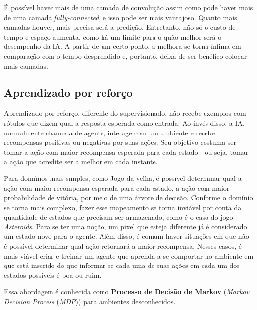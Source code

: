 É possível haver mais de uma camada de convolução assim como pode haver mais de uma camada \textit{fully-connected}, e isso pode ser mais vantajoso. Quanto mais camadas houver, mais precisa será a predição. Entretanto, não só o custo de tempo e espaço aumenta, como há um limite para o quão melhor será o desempenho da IA. A partir de um certo ponto, a melhora se torna ínfima em comparação com o tempo desprendido e, portanto, deixa de ser benéfico colocar mais camadas.

\subsection{Aprendizado por reforço}
\label{sec:rl}

Aprendizado por reforço, diferente do supervisionado, não recebe exemplos com rótulos que dizem qual a resposta esperada como entrada. Ao invés disso, a IA, normalmente chamada de agente, interage com um ambiente e recebe recompensas positivas ou negativas por suas ações. Seu objetivo costuma ser tomar a ação com maior recompensa esperada para cada estado - ou seja, tomar a ação que acredite ser a melhor em cada instante.

Para domínios mais simples, como Jogo da velha, é possível determinar qual a ação com maior recompensa esperada para cada estado, a ação com maior probabilidade de vitória, por meio de uma árvore de decisão.
Conforme o domínio se torna mais complexo, fazer esse mapeamento se torna inviável por conta da quantidade de estados que precisam ser armazenado, como é o caso do jogo \textit{Asteroids}. Para se ter uma noção, um pixel que esteja diferente já é considerado um estado novo para o agente. Além disso, é comum haver situações em que não é possível determinar qual ação retornará a maior recompensa.
Nesses casos, é mais viável criar e treinar um agente que aprenda a se comportar no ambiente em que está inserido do que informar se cada uma de suas ações em cada um dos estados possíveis é boa ou ruim.

Essa abordagem é conhecida como \textbf{Processo de Decisão de Markov} (\textit{Markov Decision Process} (\textit{MDP})) para ambientes desconhecidos.

